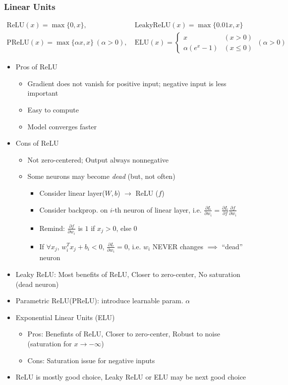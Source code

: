\subsubsection*{Linear Units}
\begin{equation}\begin{aligned}
    \text{ReLU}(x)=\max\{0,x\},&~\text{LeakyReLU}(x)=\max\{0.01 x,x\}\\
    \text{PReLU}(x)=\max\{\alpha x,x\}~(\alpha>0),&~\text{ELU}(x)=\begin{cases}
        x & (x>0) \\
        \alpha(e^x-1) & (x\leq 0)
    \end{cases}~(\alpha>0)
\end{aligned}\end{equation}
\begin{itemize}
    \item Pros of ReLU
    \begin{itemize}
        \item Gradient does not vanish for positive input; negative input is less important
        \item Easy to compute
        \item Model converges faster
    \end{itemize}
    \item Cons of ReLU
    \begin{itemize}
        \item Not zero-centered; Output always nonnegative
        \item Some neurons may become \textit{dead} (but, not often)
        \begin{itemize}
            \item Consider linear layer($W,b$) $\to$ ReLU ($f$)
            \item Consider backprop. on $i$-th neuron of linear layer, i.e. $\frac{\partial L}{\partial w_i}=\frac{\partial L}{\partial f}\frac{\partial f}{\partial w_i}$
            \item Remind: $\frac{\partial f}{\partial w_i}$ is $1$ if $x_j>0$, else $0$
            \item If $\forall x_j$, $w_i^Tx_j+b_i<0$, $\frac{\partial L}{\partial w_i}=0$, i.e. $w_i$ NEVER changes $\implies$ ``dead'' neuron
        \end{itemize}
    \end{itemize}
    \item Leaky ReLU: Most benefits of ReLU, Closer to zero-center, No saturation (dead neuron)
    \item Parametric ReLU(PReLU): introduce learnable param. $\alpha$
    \item Exponential Linear Units (ELU)
    \begin{itemize}
        \item Pros: Benefints of ReLU, Closer to zero-center, Robust to noise (saturation for $x\to-\infty$)
        \item Cons: Saturation issue for negative inputs
    \end{itemize}
    \item ReLU is mostly good choice, Leaky ReLU or ELU may be next good choice
\end{itemize}
\begin{figures}
\end{figures}
